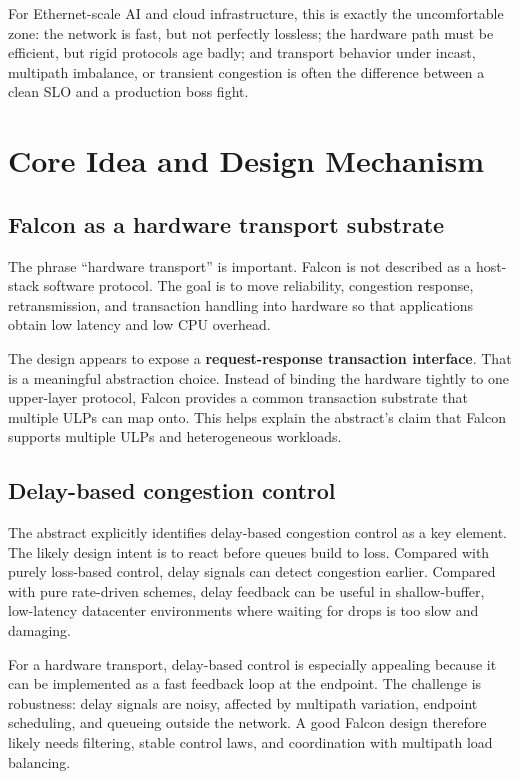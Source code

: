 \documentclass[11pt]{article}
\begin{document}
For Ethernet-scale AI and cloud infrastructure, this is exactly the uncomfortable zone: the network is fast, but not perfectly lossless; the hardware path must be efficient, but rigid protocols age badly; and transport behavior under incast, multipath imbalance, or transient congestion is often the difference between a clean SLO and a production boss fight.

\section{Core Idea and Design Mechanism}

\subsection{Falcon as a hardware transport substrate}

The phrase ``hardware transport'' is important. Falcon is not described as a host-stack software protocol. The goal is to move reliability, congestion response, retransmission, and transaction handling into hardware so that applications obtain low latency and low CPU overhead.

The design appears to expose a \textbf{request-response transaction interface}. That is a meaningful abstraction choice. Instead of binding the hardware tightly to one upper-layer protocol, Falcon provides a common transaction substrate that multiple ULPs can map onto. This helps explain the abstract's claim that Falcon supports multiple ULPs and heterogeneous workloads.

\subsection{Delay-based congestion control}

The abstract explicitly identifies delay-based congestion control as a key element. The likely design intent is to react before queues build to loss. Compared with purely loss-based control, delay signals can detect congestion earlier. Compared with pure rate-driven schemes, delay feedback can be useful in shallow-buffer, low-latency datacenter environments where waiting for drops is too slow and damaging.

For a hardware transport, delay-based control is especially appealing because it can be implemented as a fast feedback loop at the endpoint. The challenge is robustness: delay signals are noisy, affected by multipath variation, endpoint scheduling, and queueing outside the network. A good Falcon design therefore likely needs filtering, stable control laws, and coordination with multipath load balancing.
\end{document}
